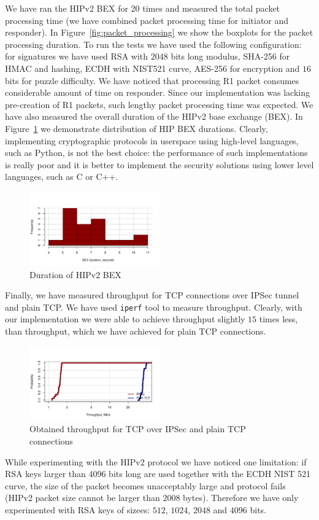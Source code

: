 We have ran the HIPv2 BEX for 20 times and measured the total packet processing time (we have combined packet 
processing time for initiator and responder). In Figure~\ref{fig:packet_processing} we show the boxplots for 
the packet processing duration. To run the tests we have used the following configuration: for signatures 
we have used RSA with $2048$ bits long modulus, SHA-256 for HMAC and hashing, ECDH with NIST521 curve, 
AES-256 for encryption and $16$ bits for puzzle difficulty. We have noticed that processing R1 packet consumes considerable
amount of time on responder. Since our implementation was lacking pre-creation of R1 packets, such lengthy packet 
processing time was expected. We have also measured the overall duration of the HIPv2 base exchange (BEX). 
In Figure~\ref{fig:duration_bex} we demonstrate distribution of HIP BEX durations. Clearly, implementing 
cryptographic protocols in userspace using high-level languages, such as Python, is not the best choice: the performance
of such implementations is really poor and it is better to implement the security solutions using lower 
level languages, such as C or C++. 

\begin{figure}
	\includegraphics[width=0.5\textwidth]{graphics/duration_bex.pdf}
	\caption{Duration of HIPv2 BEX}
	\label{fig:duration_bex}
\end{figure}

Finally, we have measured throughput for TCP connections over IPSec tunnel and plain TCP. We have used
\texttt{iperf} tool to measure throughput. Clearly, with our implementation we were able to achieve
throughput slightly $15$ times less, than throughput, which we have achieved for plain TCP connections.

\begin{figure}
	\includegraphics[width=0.5\textwidth]{graphics/throughput.pdf}
	\caption{Obtained throughput for TCP over IPSec and plain TCP connections}
	\label{fig:throughput}
\end{figure}

While experimenting with the HIPv2 protocol we have noticed one limitation:
if RSA keys larger than 4096 bits long are used together with the ECDH NIST 521
curve, the size of the packet becomes unacceptably large and protocol fails (HIPv2
packet size cannot be larger than 2008 bytes). Therefore we have only experimented 
with RSA keys of sizees: $512$, $1024$, $2048$ and $4096$ bits. 
